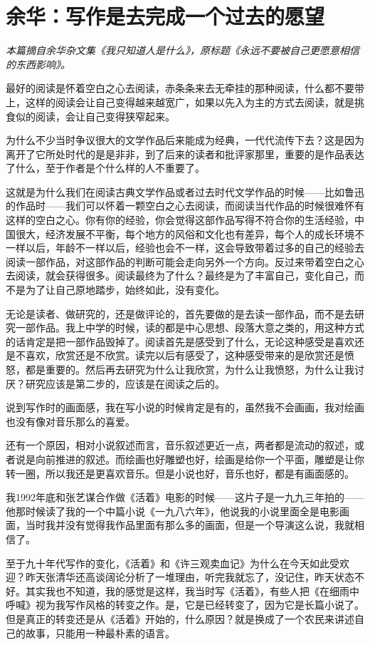 \documentclass[fontset=fandol,12pt,a5paper]{ctexbook}
\begin{document}
\newpage
\section{余华：写作是去完成一个过去的愿望}

\emph{本篇摘自余华杂文集《我只知道人是什么》，原标题《永远不要被自己更愿意相信的东西影响》。}
\vspace{2em}

最好的阅读是怀着空白之心去阅读，赤条条来去无牵挂的那种阅读，什么都不要带上，这样的阅读会让自己变得越来越宽广，如果以先入为主的方式去阅读，就是挑食似的阅读，会让自己变得狭窄起来。

为什么不少当时争议很大的文学作品后来能成为经典，一代代流传下去？这是因为离开了它所处时代的是是非非，到了后来的读者和批评家那里，重要的是作品表达了什么，至于作者是个什么样的人不重要了。

这就是为什么我们在阅读古典文学作品或者过去时代文学作品的时候——比如鲁迅的作品时——我们可以怀着一颗空白之心去阅读，而阅读当代作品的时候很难怀有这样的空白之心。你有你的经验，你会觉得这部作品写得不符合你的生活经验，中国很大，经济发展不平衡，每个地方的风俗和文化也有差异，每个人的成长环境不一样以后，年龄不一样以后，经验也会不一样，这会导致带着过多的自己的经验去阅读一部作品，对这部作品的判断可能会走向另外一个方向。反过来带着空白之心去阅读，就会获得很多。阅读最终为了什么？最终是为了丰富自己，变化自己，而不是为了让自己原地踏步，始终如此，没有变化。

无论是读者、做研究的，还是做评论的，首先要做的是去读一部作品，而不是去研究一部作品。我上中学的时候，读的都是中心思想、段落大意之类的，用这种方式的话肯定是把一部作品毁掉了。阅读首先是感受到了什么，无论这种感受是喜欢还是不喜欢，欣赏还是不欣赏。读完以后有感受了，这种感受带来的是欣赏还是愤怒，都是重要的。然后再去研究为什么让我欣赏，为什么让我愤怒，为什么让我讨厌？研究应该是第二步的，应该是在阅读之后的。

说到写作时的画面感，我在写小说的时候肯定是有的，虽然我不会画画，我对绘画也没有像对音乐那么的喜爱。

还有一个原因，相对小说叙述而言，音乐叙述更近一点，两者都是流动的叙述，或者说是向前推进的叙述。而绘画也好雕塑也好，绘画是给你一个平面，雕塑是让你转一圈，所以我还是更喜欢音乐。但是小说也好，音乐也好，都是有画面感的。

我1992年底和张艺谋合作做《活着》电影的时候——这片子是一九九三年拍的——他那时候读了我的一个中篇小说《一九八六年》，他说我的小说里面全是电影画面，当时我并没有觉得我作品里面有那么多的画面，但是一个导演这么说，我就相信了。

至于九十年代写作的变化，《活着》和《许三观卖血记》为什么在今天如此受欢迎？昨天张清华还高谈阔论分析了一堆理由，听完我就忘了，没记住，昨天状态不好。其实我也不知道，我的感觉是这样，我当时写《活着》，有些人把《在细雨中呼喊》视为我写作风格的转变之作。是，它是已经转变了，因为它是长篇小说了。但是真正的转变还是从《活着》开始的，什么原因？就是换成了一个农民来讲述自己的故事，只能用一种最朴素的语言。
\end{document}
